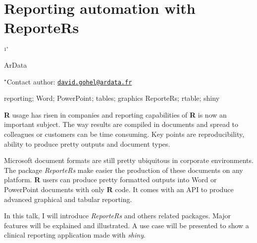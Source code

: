 \documentclass[\main/boa.tex]{subfiles}
\begin{document}
\section{Reporting automation with ReporteRs}

\begin{center}
  {\bf {}$^{1^\star}$}
\end{center}

\vskip 0.3cm

\begin{affiliations}
\begin{enumerate}
\begin{minipage}{0.915\textwidth}
\centering
\item ArData \\[-2pt]
\end{minipage}
\end{enumerate}
$^\star$Contact author: \href{mailto:david.gohel@ardata.fr}{\nolinkurl{david.gohel@ardata.fr}}\\
\end{affiliations}

\vskip 0.5cm

\begin{minipage}{0.915\textwidth}
\keywords reporting; Word; PowerPoint; tables; graphics
\packages ReporteRs; rtable; shiny
\end{minipage}

\vskip 0.8cm

\textbf{R} usage has risen in companies and reporting capabilities of
\textbf{R} is now an important subject. The way results are compiled in
documents and spread to colleagues or customers can be time consuming.
Key points are reproducibility, ability to produce pretty outputs and
document types.

Microsoft document formats are still pretty ubiquitous in corporate
environments. The package \emph{ReporteRs} make easier the production of
these documents on any platform. \textbf{R} users can produce pretty
formatted outputs into Word or PowerPoint documents with only \textbf{R}
code. It comes with an API to produce advanced graphical and tabular
reporting.

In this talk, I will introduce \emph{ReporteRs} and others related
packages. Major features will be explained and illustrated. A use case
will be presented to show a clinical reporting application made with
\emph{shiny}.
\end{document}
